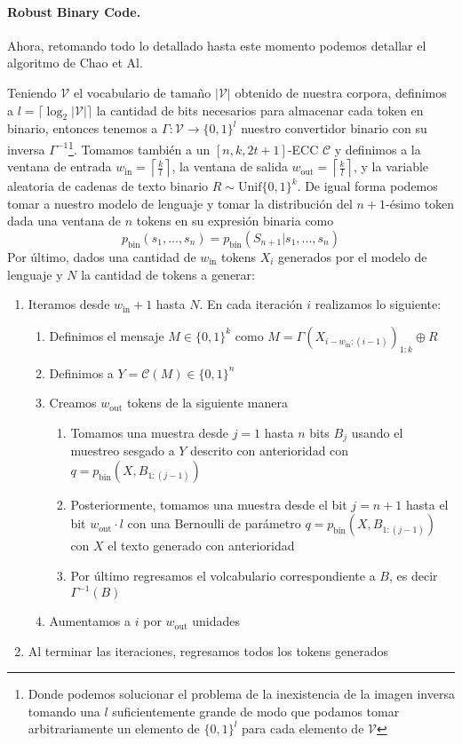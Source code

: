 \documentclass[a4paper,11pt]{article}
\begin{document}
\paragraph{Robust Binary Code.} Ahora, retomando todo lo detallado hasta este momento podemos detallar el algoritmo de Chao et Al\cite{chao_watermarking_2025}. 
\par Teniendo $\mathcal V$ el vocabulario de tamaño $|\mathcal V|$ obtenido de nuestra corpora, definimos a $l=\lceil\log_2|\mathcal V|\rceil$ la cantidad de bits necesarios para almacenar cada token en binario, entonces tenemos a $\Gamma:\mathcal V\to\{0,1\}^l$ nuestro convertidor binario con su inversa $\Gamma^{-1}$\footnote{Donde podemos solucionar el problema de la inexistencia de la imagen inversa tomando una $l$ suficientemente grande de modo que podamos tomar arbitrariamente un elemento de $\{0,1\}^l$ para cada elemento de $\mathcal V$}. Tomamos también a un $[n,k,2t+1]$-ECC $\mathcal C$ y definimos a la ventana de entrada $w_{\textrm{in}}=\left\lceil\frac{k}{l}\right\rceil$, la ventana de salida $w_{\textrm{out}}=\left\lceil\frac{k}{l}\right\rceil$, y la variable aleatoria de cadenas de texto binario $R\sim\textrm{Unif}\{0,1\}^k$. De igual forma podemos tomar a nuestro modelo de lenguaje y tomar la distribución del $n+1$-ésimo token dada una ventana de $n$ tokens en su expresión binaria como
\[p_{\textrm{bin}}(s_1,...,s_n)=p_{\textrm{bin}}(S_{n+1}|s_1,...,s_n)\]
Por último, dados una cantidad de $w_{\textrm{in}}$ tokens $X_i$ generados por el modelo de lenguaje y $N$ la cantidad de tokens a generar:
\begin{enumerate}
    \item Iteramos desde $w_{\textrm{in}}+1$ hasta $N$. En cada iteración $i$ realizamos lo siguiente:
    \begin{enumerate}
        \item Definimos el mensaje $M\in\{0,1\}^k$ como $M=\Gamma(X_{i-w_{\textrm{in}}:(i-1)})_{1:k}  \oplus R$
        \item Definimos a $Y=\mathcal{C}(M)\in\{0,1\}^n$
        \item Creamos $w_{\textrm{out}}$ tokens de la siguiente manera
        \begin{enumerate}
            \item Tomamos una muestra 
            desde $j=1$ hasta $n$ bits $B_j$ 
            usando el muestreo sesgado a $Y$
            descrito con anterioridad con $q=p_{\textrm{bin}}(X,B_{1:(j-1)})$
            \item Posteriormente, tomamos una muestra desde el bit $j=n+1$ hasta el bit $w_{\textrm{out}}\cdot l$ con una Bernoulli de parámetro $q=p_{\textrm{bin}}(X,B_{1:(j-1)})$ con $X$ el texto generado con anterioridad
            \item Por último regresamos el volcabulario correspondiente a $B$, es decir $\Gamma^{-1}(B)$
        \end{enumerate}
        \item Aumentamos a $i$ por $w_{\textrm{out}}$ unidades
    \end{enumerate}
    \item Al terminar las iteraciones, regresamos todos los tokens generados
\end{enumerate}
\end{document}
